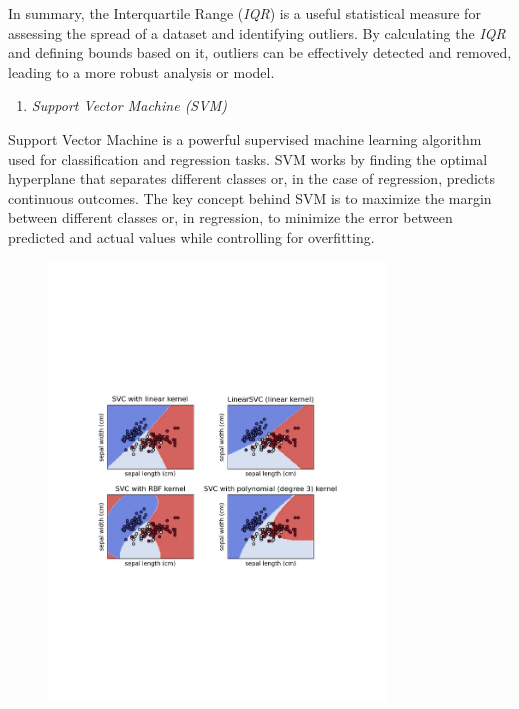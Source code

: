 In summary, the Interquartile Range (\emph{IQR}) is a useful statistical
measure for assessing the spread of a dataset and identifying outliers.
By calculating the \emph{IQR} and defining bounds based on it, outliers
can be effectively detected and removed, leading to a more robust
analysis or model.

\begin{enumerate}
\def\labelenumi{\Alph{enumi}.}
\setcounter{enumi}{5}
\item
  \emph{Support Vector Machine (SVM)}
\end{enumerate}

Support Vector Machine is a powerful supervised machine learning
algorithm used for classification and regression tasks. SVM works by
finding the optimal hyperplane that separates different classes or, in
the case of regression, predicts continuous outcomes. The key concept
behind SVM is to maximize the margin between different classes or, in
regression, to minimize the error between predicted and actual values
while controlling for overfitting.

\begin{figure}[H]
	\centering
	\includegraphics[width=0.8\textwidth]{media/ict/image21}
	\caption*{}
\end{figure}


